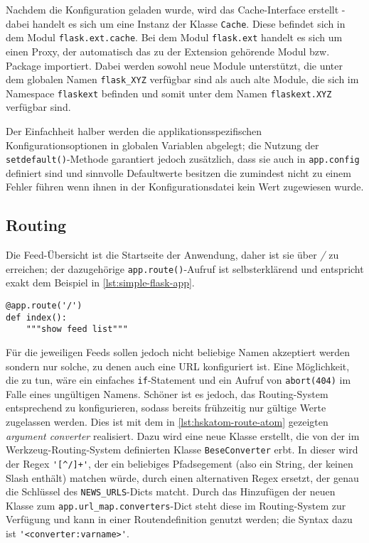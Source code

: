 Nachdem die Konfiguration geladen wurde, wird das Cache-Interface erstellt - dabei handelt es sich
um eine Instanz der Klasse \lstinline{Cache}. Diese befindet sich in dem Modul
\lstinline{flask.ext.cache}. Bei dem Modul \lstinline{flask.ext} handelt es sich um einen Proxy, der
automatisch das zu der Extension gehörende Modul bzw. Package importiert. Dabei werden sowohl neue
Module unterstützt, die unter dem globalen Namen \lstinline{flask_XYZ} verfügbar sind als auch alte
Module, die sich im Namespace \lstinline{flaskext} befinden und somit unter dem Namen
\lstinline{flaskext.XYZ} verfügbar sind.

Der Einfachheit halber werden die applikationsspezifischen Konfigurationsoptionen in globalen
Variablen abgelegt; die Nutzung der \lstinline{setdefault()}-Methode garantiert jedoch zusätzlich,
dass sie auch in \lstinline{app.config} definiert sind und sinnvolle Defaultwerte besitzen die
zumindest nicht zu einem Fehler führen wenn ihnen in der Konfigurationsdatei kein Wert zugewiesen
wurde.

\subsection{Routing}

Die Feed-Übersicht ist die Startseite der Anwendung, daher ist sie über \emph{/} zu erreichen; der
dazugehörige \lstinline{app.route()}-Aufruf ist selbsterklärend und entspricht exakt dem Beispiel in
\autoref{lst:simple-flask-app}.

\begin{lstlisting}[caption=HSKAtom - Routing,label=lst:hskatom-route-index]
@app.route('/')
def index():
    """show feed list"""
\end{lstlisting}

Für die jeweiligen Feeds sollen jedoch nicht beliebige Namen akzeptiert werden sondern nur solche,
zu denen auch eine URL konfiguriert ist. Eine Möglichkeit, die zu tun, wäre ein einfaches
\lstinline{if}-Statement und ein Aufruf von \lstinline{abort(404)} im Falle eines ungültigen Namens.
Schöner ist es jedoch, das Routing-System entsprechend zu konfigurieren, sodass bereits frühzeitig
nur gültige Werte zugelassen werden. Dies ist mit dem in \autoref{lst:hskatom-route-atom} gezeigten
\emph{argument converter} realisiert. Dazu wird eine neue Klasse erstellt, die von der im
Werkzeug-Routing-System definierten Klasse \lstinline{BeseConverter} erbt. In dieser wird der Regex
\lstinline{'[^/]+'}, der ein beliebiges Pfadsegement (also ein String, der keinen Slash enthält)
matchen würde, durch einen alternativen Regex ersetzt, der genau die Schlüssel des
\lstinline{NEWS_URLS}-Dicts matcht. Durch das Hinzufügen der neuen Klasse zum
\lstinline{app.url_map.converters}-Dict steht diese im Routing-System zur Verfügung und kann in einer
Routendefinition genutzt werden; die Syntax dazu ist \lstinline{'<converter:varname>'}.

